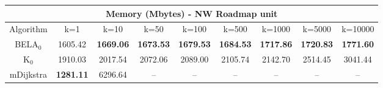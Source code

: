 \begin{tabular}{c|cccccccc}\toprule
\multicolumn{9}{c}{Memory (Mbytes) - NW Roadmap unit}\\ \midrule
Algorithm & k=1 & k=10 & k=50 & k=100 & k=500 & k=1000 & k=5000 & k=10000 \\ \midrule
BELA$_0$ & 1605.42 & \textbf{1669.06} & \textbf{1673.53} & \textbf{1679.53} & \textbf{1684.53} & \textbf{1717.86} & \textbf{1720.83} & \textbf{1771.60} \\
K$_0$ & 1910.03 & 2017.54 & 2072.06 & 2089.00 & 2105.74 & 2142.70 & 2514.45 & 3041.44 \\
mDijkstra & \textbf{1281.11} & 6296.64 & -- & -- & -- & -- & -- & -- \\ \bottomrule 
\end{tabular}
